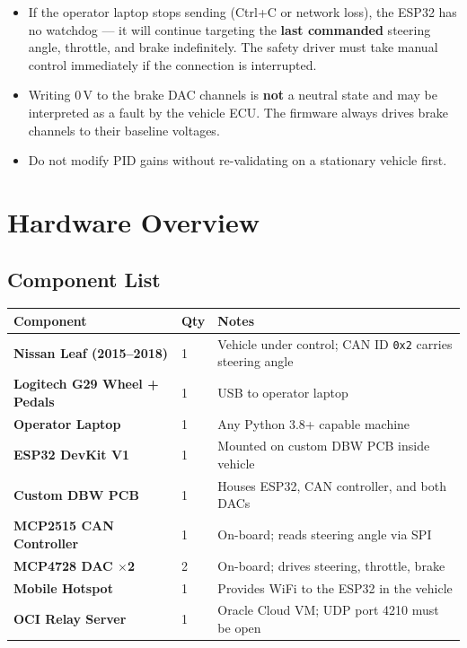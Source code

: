 ﻿\documentclass[12pt, letterpaper]{article}
\begin{document}
\begin{warningbox}
\begin{itemize}[leftmargin=*]
  \item If the operator laptop stops sending (Ctrl+C or network loss), the ESP32
        has no watchdog --- it will continue targeting the \textbf{last commanded}
        steering angle, throttle, and brake indefinitely.  The safety driver must
        take manual control immediately if the connection is interrupted.
  \item Writing 0\,V to the brake DAC channels is \textbf{not} a neutral state and may
        be interpreted as a fault by the vehicle ECU.  The firmware always drives brake
        channels to their baseline voltages.
  \item Do not modify PID gains without re-validating on a stationary vehicle first.
\end{itemize}
\end{warningbox}

\section{Hardware Overview}

\subsection{Component List}

\begin{longtable}{>{\bfseries}p{4.6cm}p{1.2cm}p{7.4cm}}
  \toprule
  \textbf{Component} & \textbf{Qty} & \textbf{Notes}\\
  \midrule\endhead\bottomrule\endfoot
  Nissan Leaf (2015--2018)          & 1 & Vehicle under control; CAN ID \texttt{0x2} carries steering angle\\[3pt]
  Logitech G29 Wheel + Pedals       & 1 & USB to operator laptop\\[3pt]
  Operator Laptop                   & 1 & Any Python 3.8+ capable machine\\[3pt]
  ESP32 DevKit V1                   & 1 & Mounted on custom DBW PCB inside vehicle\\[3pt]
  Custom DBW PCB                    & 1 & Houses ESP32, CAN controller, and both DACs\\[3pt]
  MCP2515 CAN Controller            & 1 & On-board; reads steering angle via SPI\\[3pt]
  MCP4728 DAC $\times$2             & 2 & On-board; drives steering, throttle, brake\\[3pt]
  Mobile Hotspot                    & 1 & Provides WiFi to the ESP32 in the vehicle\\[3pt]
  OCI Relay Server                  & 1 & Oracle Cloud VM; UDP port 4210 must be open\\
\end{longtable}
\end{document}
